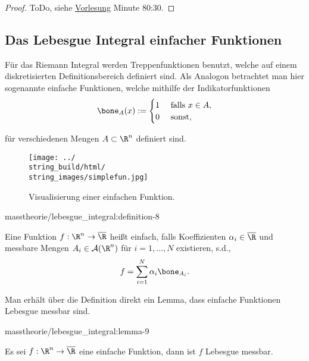 \documentclass[letterpaper,10pt,german]{jupyterBook}
\begin{document}
\begin{proof}
 ToDo, siehe \href{https://www.fau.tv/clip/id/40563}{Vorlesung} Minute 80:30.
\end{proof}


\subsection{Das Lebesgue Integral einfacher Funktionen}
\label{\detokenize{masstheorie/lebesgue_integral:das-lebesgue-integral-einfacher-funktionen}}
\par
Für das Riemann Integral werden Treppenfunktionen benutzt, welche auf einem diskretisierten Definitionsbereich definiert sind. Als Analogon betrachtet man hier sogenannte einfache Funktionen, welche mithilfe der Indikatorfunktionen
\begin{align*}
\bone_A(x):=
\begin{cases}
1&\text{ falls }x\in A,\\
0&\text{ sonst,}
\end{cases}
\end{align*}
\par
für verschiedenen Mengen \(A\subset \R^n\) definiert sind.

\begin{figure}[htbp]
\centering


\noindent\texttt{[image: ../\\string\_build/html/\\string\_images/simplefun.jpg]}
\caption{Visualisierung einer einfachen Funktion.}\label{\detokenize{masstheorie/lebesgue_integral:fig-simplefun}}\end{figure}
\begin{definition}{}{masstheorie/lebesgue_integral:definition-8}



\par
Eine Funktion \(f:\R^n\to\overline{\R}\) heißt einfach, falls Koeffizienten \(\alpha_i\in\overline{\R}\) und messbare Mengen \(A_i\in\mathcal{A}(\R^n)\) für \(i=1,\ldots,N\) existieren, s.d.,
\begin{align*}
f = \sum_{i=1}^N \alpha_i \bone_{A_i}.
\end{align*}\end{definition}

\par
Man erhält über die Definition direkt ein Lemma, dass einfache Funktionen Lebesgue messbar sind.
\begin{lemma}{}{masstheorie/lebesgue_integral:lemma-9}



\par
Es sei \(f:\R^n\to\overline{\R}\) eine einfache Funktion, dann ist \(f\) Lebesgue messbar.
\end{lemma}
\end{document}
